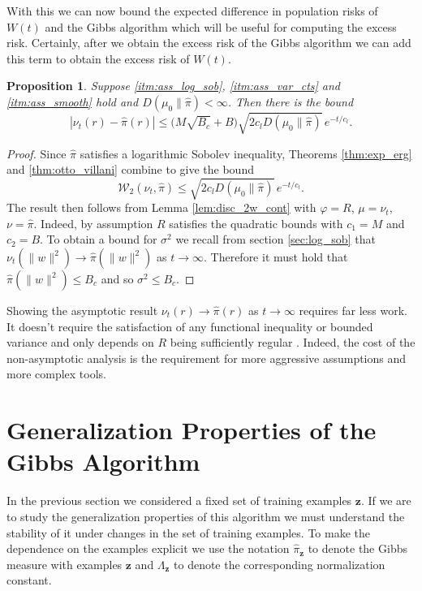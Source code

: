 \documentclass{article}
\newtheorem{proposition}[theorem]{Proposition}
\newcommand{\Bbf}[1]{\mathbf{#1}}
\newcommand{\Bcal}[1]{\mathcal{#1}}
\begin{document}
With this we can now bound the expected difference in population risks of \(W(t)\) and the Gibbs algorithm which will be useful for computing the excess risk. Certainly, after we obtain the excess risk of the Gibbs algorithm we can add this term to obtain the excess risk of \(W(t)\).

\begin{proposition}\label{prop:est_in_risk}
Suppose \ref{itm:ass_log_sob}, \ref{itm:ass_var_cts} and \ref{itm:ass_smooth} hold and \(D(\mu_0 \| \hat{\pi}) < \infty\). Then there is the bound
\begin{equation*}
    |\nu_t(r) - \hat{\pi}(r)| \leq \big ( M\sqrt{B_c} + B \big ) \sqrt{2 c_l D(\mu_0 \| \hat{\pi})} \, e^{-t/c_l}.
\end{equation*}
\end{proposition}
\begin{proof}
Since \(\hat{\pi}\) satisfies a logarithmic Sobolev inequality, Theorems \ref{thm:exp_erg} and \ref{thm:otto_villani} combine to give the bound
\begin{equation*}
    \Bcal{W}_2(\nu_t, \hat{\pi}) \leq \sqrt{2 c_l D(\mu_0 \| \hat{\pi})} \, e^{-t/c_l}.
\end{equation*}
The result then follows from Lemma \ref{lem:disc_2w_cont} with \(\varphi = R\), \(\mu = \nu_t\), \(\nu = \hat{\pi}\). Indeed, by assumption \(R\) satisfies the quadratic bounds with \(c_1 = M\) and \(c_2 = B\). To obtain a bound for \(\sigma^2\) we recall from section \ref{sec:log_sob} that \(\nu_t(\|w\|^2) \to \hat{\pi}(\|w\|^2)\) as \(t \to \infty\). Therefore it must hold that \(\hat{\pi}(\|w\|^2) \leq B_c\) and so \(\sigma^2 \leq B_c\).
\end{proof}

Showing the asymptotic result \(\nu_t(r) \to \hat{\pi}(r)\) as \(t \to \infty\) requires far less work. It doesn't require the satisfaction of any functional inequality or bounded variance and only depends on \(R\) being sufficiently regular \cite{Pavliotis2014StochasticApplications}. Indeed, the cost of the non-asymptotic analysis is the requirement for more aggressive assumptions and more complex tools.

\section{Generalization Properties of the Gibbs Algorithm}
In the previous section we considered a fixed set of training examples \(\Bbf{z}\). If we are to study the generalization properties of this algorithm we must understand the stability of it under changes in the set of training examples. To make the dependence on the examples explicit we use the notation \(\hat{\pi}_{\Bbf{z}}\) to denote the Gibbs measure with examples \(\Bbf{z}\) and \(\Lambda_{\Bbf{z}}\) to denote the corresponding normalization constant.
\end{document}
